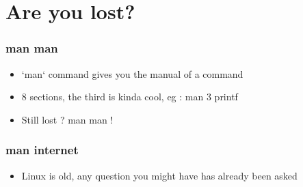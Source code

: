 \section{Are you lost?}


\begin{frame}
    \frametitle{man man}
    \begin{itemize}
	\item `man` command gives you the manual of a command
	\item 8 sections, the third is kinda cool, eg : man 3 printf
	\item Still lost ? man man !
    \end{itemize}
\end{frame}

\begin{frame}
    \frametitle{man internet}
    \begin{itemize}
	\item Linux is old, any question you might have has already been asked
    \end{itemize}
\end{frame}
